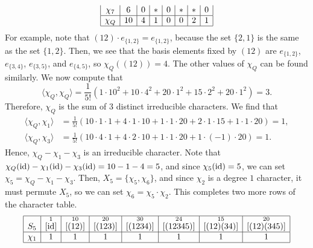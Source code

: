 \begin{exmp}{}
\begin{align*}
\begin{array}{|c|c|c|c|c|c|c|c|}
            \chi_7 & 6                  & 0                    & *                     & 0                      & *                       & *                        & 0                         \\ \hline
            \chi_Q & 10                 & 4                    & 1                     & 0                      & 0                       & 2                        & 1                         \\ \hline 
        \end{array} 
    \end{align*}
    For example, note that $(12) \cdot e_{\{1,2\}} 
    = e_{\{1,2\}}$, because the set $\{2, 1\}$ is the same as the set $\{1, 2\}$. 
    Then, we see that the basis elements fixed by $(12)$ are $e_{\{1,2\}}$, 
    $e_{\{3,4\}}$, $e_{\{3,5\}}$, and $e_{\{4,5\}}$, so $\chi_Q((12)) = 4$. 
    The other values of $\chi_Q$ can be found similarly. We now compute that 
    \[ \langle \chi_Q, \chi_Q \rangle = \frac1{5!}(1 \cdot 10^2 
    + 10 \cdot 4^2 + 20 \cdot 1^2 + 15 \cdot 2^2 + 20 \cdot 1^2) = 3. \] 
    Therefore, $\chi_Q$ is the sum of $3$ distinct irreducible characters. 
    We find that 
    \begin{align*}
        \langle \chi_Q, \chi_1 \rangle &= \frac1{5!}(10 \cdot 1 \cdot 1 
        + 4 \cdot 1 \cdot 10 + 1 \cdot 1 \cdot 20 + 2 \cdot 1 \cdot 15 
        + 1 \cdot 1 \cdot 20) = 1, \\ 
        \langle \chi_Q, \chi_3 \rangle &= \frac1{5!}(10 \cdot 4 \cdot 1 
        + 4 \cdot 2 \cdot 10 + 1 \cdot 1 \cdot 20 + 1 \cdot (-1) \cdot 20) = 1. 
    \end{align*}
    Hence, $\chi_Q - \chi_1 - \chi_3$ is an irreducible character. 
    Note that $\chi_Q(\operatorname{id}) - \chi_1(\operatorname{id}) - \chi_3(\operatorname{id}) = 10 - 1 - 4 = 5$, and 
    since $\chi_5(\operatorname{id}) = 5$, we can set $\chi_5 = \chi_Q - \chi_1 - \chi_3$. 
    Then, $X_5 = \{\chi_5, \chi_6\}$, and since $\chi_2$ is a degree $1$ 
    character, it must permute $X_5$, so we can set $\chi_6 = \chi_5 \cdot \chi_2$. 
    This completes two more rows of the character table. 
    \begin{align*}
        \begin{array}{|c|c|c|c|c|c|c|c|}
            \hline
            S_5    & \overset{1}{[\operatorname{id}]} & \overset{10}{[(12)]} & \overset{20}{[(123)]} & \overset{30}{[(1234)]} & \overset{24}{[(12345)]} & \overset{15}{[(12)(34)]} & \overset{20}{[(12)(345)]} \\ \hline
            \chi_1 & 1                  & 1                    & 1                     & 1                      & 1                       & 1                        & 1                         \\ \hline

\end{array}
\end{align*}
\end{exmp}
